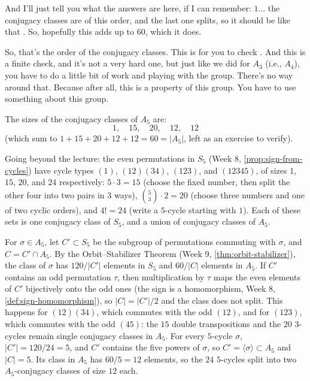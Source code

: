 \begin{proofWrapper}
\begin{speech}[00:24:15 - 00:25:12]
And I'll just tell you what the answers are here, if I can remember: $1$... the conjugacy classes are of this order, and the last one splits, so it should be like that . So, hopefully this adds up to $60$, which it does.

So, that's the order of the conjugacy classes. This is for you to check . And this is a finite check, and it's not a very hard one, but just like we did for $A_3$ (i.e., $A_4$), you have to do a little bit of work and playing with the group. There's no way around that. Because after all, this is a property of this group. You have to use something about this group.
\end{speech}

\begin{content}
The sizes of the conjugacy classes of $A_5$ are:
\[
1, \quad 15, \quad 20, \quad 12, \quad 12
\]
(which sum to $1 + 15 + 20 + 12 + 12 = 60 = |A_5|$, left as an exercise to verify).

\begin{steps}
Going beyond the lecture: the even permutations in $S_5$ (Week 8, \cref{prop:sign-from-cycles}) have cycle types $(1)$, $(12)(34)$, $(123)$, and $(12345)$, of sizes $1$, $15$, $20$, and $24$ respectively: $5 \cdot 3 = 15$ (choose the fixed number, then split the other four into two pairs in $3$ ways), $\binom{5}{3} \cdot 2 = 20$ (choose three numbers and one of two cyclic orders), and $4! = 24$ (write a $5$-cycle starting with $1$). Each of these sets is one conjugacy class of $S_5$, and a union of conjugacy classes of $A_5$.

For $\sigma \in A_5$, let $C' \subset S_5$ be the subgroup of permutations commuting with $\sigma$, and $C = C' \cap A_5$. By the Orbit--Stabilizer Theorem (Week 9, \cref{thm:orbit-stabilizer}), the class of $\sigma$ has $120 / |C'|$ elements in $S_5$ and $60 / |C|$ elements in $A_5$. If $C'$ contains an odd permutation $\tau$, then multiplication by $\tau$ maps the even elements of $C'$ bijectively onto the odd ones (the sign is a homomorphism, Week 8, \cref{def:sign-homomorphism}), so $|C| = |C'| / 2$ and the class does not split. This happens for $(12)(34)$, which commutes with the odd $(12)$, and for $(123)$, which commutes with the odd $(45)$: the $15$ double transpositions and the $20$ $3$-cycles remain single conjugacy classes in $A_5$. For every $5$-cycle $\sigma$, $|C'| = 120 / 24 = 5$, and $C'$ contains the five powers of $\sigma$, so $C' = \langle \sigma \rangle \subset A_5$ and $|C| = 5$. Its class in $A_5$ has $60 / 5 = 12$ elements, so the $24$ $5$-cycles split into two $A_5$-conjugacy classes of size $12$ each.
\end{steps}
\end{content}


\end{proofWrapper}
